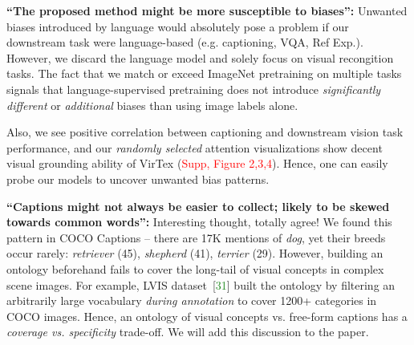 \documentclass[rebuttal]{cvpr}
\newcommand{\virtex}[0]{VirTex}
\newcommand{\rfive}{\textcolor{Magenta}{\textbf{R5}}}
\newcommand{\fakeref}[1]{\textcolor{Red}{#1}}
\newcommand{\fakecite}[1]{\textcolor{ForestGreen}{#1}}
\begin{document}
\noindent [\rfive] \textbf{``The proposed method might be more susceptible to biases'':}
Unwanted biases introduced by language would absolutely pose a problem if our downstream task were language-based (e.g. captioning, VQA, Ref Exp.).
However, we discard the language model and solely focus on visual recongition tasks.
The fact that we match or exceed ImageNet pretraining on multiple tasks signals that language-supervised pretraining does not introduce \emph{significantly different} or \emph{additional} biases than using image labels alone.

Also, we see positive correlation between captioning and downstream vision task performance,
and our \emph{randomly selected} attention visualizations show decent visual grounding ability of \virtex{} (\fakeref{Supp, Figure 2,3,4}).
Hence, one can easily probe our models to uncover unwanted bias patterns.

\noindent [\rfive] \textbf{``Captions might not always be easier to collect; likely to be skewed towards common words'':}
Interesting thought, totally agree! We found this pattern in COCO Captions --
there are 17K mentions of \emph{dog}, yet their breeds occur rarely:
\emph{retriever} (45), \emph{shepherd} (41), \emph{terrier} (29).
However, building an ontology beforehand fails to cover the long-tail of visual concepts in complex scene images.
For example, LVIS dataset~[\fakecite{31}] built the ontology by filtering an arbitrarily large vocabulary \emph{during annotation} to cover 1200+ categories in COCO images.
Hence, an ontology of visual concepts vs. free-form captions has a \textit{coverage vs. specificity} trade-off.
We will add this discussion to the paper.
\end{document}
